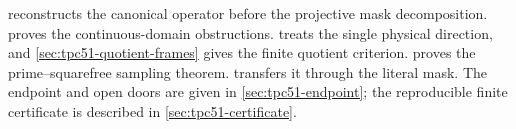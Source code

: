  reconstructs the canonical
operator before the projective mask decomposition.
 proves the continuous-domain
obstructions.   treats the single
physical direction, and \cref{sec:tpc51-quotient-frames} gives the
finite quotient criterion.  
proves the prime--squarefree sampling theorem.
 transfers it through the literal mask.
The endpoint and open doors are given in \cref{sec:tpc51-endpoint}; the
reproducible finite certificate is described in
\cref{sec:tpc51-certificate}.
